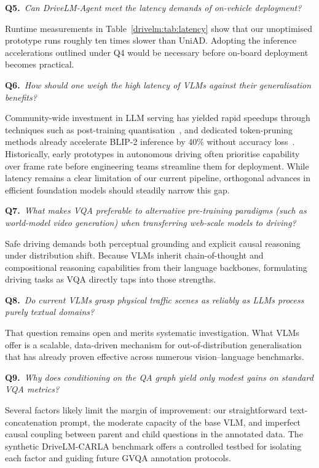 \medskip\noindent\textbf{Q5.}~\emph{Can DriveLM-Agent meet the latency demands of on-vehicle deployment?}

\noindent Runtime measurements in Table~\ref{drivelm:tab:latency} show that our unoptimised prototype runs roughly ten times slower than UniAD. Adopting the inference accelerations outlined under Q4 would be necessary before on-board deployment becomes practical.

\medskip\noindent\textbf{Q6.}~\emph{How should one weigh the high latency of VLMs against their generalisation benefits?}

\noindent Community-wide investment in LLM serving has yielded rapid speedups through techniques such as post-training quantisation~\cite{xiao2023smoothquant}, and dedicated token-pruning methods already accelerate BLIP-2 inference by 40\% without accuracy loss~\cite{shi2023crossget}. Historically, early prototypes in autonomous driving often prioritise capability over frame rate before engineering teams streamline them for deployment. While latency remains a clear limitation of our current pipeline, orthogonal advances in efficient foundation models should steadily narrow this gap.

\medskip\noindent\textbf{Q7.}~\emph{What makes VQA preferable to alternative pre-training paradigms (such as world-model video generation) when transferring web-scale models to driving?}

\noindent Safe driving demands both perceptual grounding and explicit causal reasoning under distribution shift. Because VLMs inherit chain-of-thought and compositional reasoning capabilities from their language backbones, formulating driving tasks as VQA directly taps into those strengths.

\medskip\noindent\textbf{Q8.}~\emph{Do current VLMs grasp physical traffic scenes as reliably as LLMs process purely textual domains?}

\noindent That question remains open and merits systematic investigation. What VLMs offer is a scalable, data-driven mechanism for out-of-distribution generalisation that has already proven effective across numerous vision--language benchmarks.

\medskip\noindent\textbf{Q9.}~\emph{Why does conditioning on the QA graph yield only modest gains on standard VQA metrics?}

\noindent Several factors likely limit the margin of improvement: our straightforward text-concatenation prompt, the moderate capacity of the base VLM, and imperfect causal coupling between parent and child questions in the annotated data. The synthetic DriveLM-CARLA benchmark offers a controlled testbed for isolating each factor and guiding future GVQA annotation protocols.

